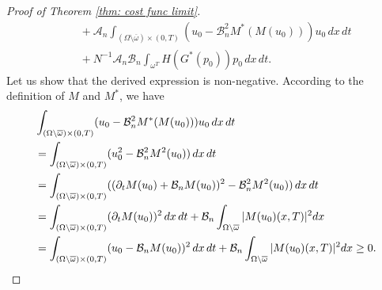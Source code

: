 \documentclass[reqno]{amsart}
\begin{document}
\begin{proof}[Proof of Theorem \ref{thm: cost func limit}]
\begin{align*}
&\quad +\mathcal{A}_n\int _{(\Omega \setminus \overline{\omega })\times
(0,T)}(u_0-\mathcal{B}_n^2M^{\ast }(M(u_0)))u_0\,dx\,dt \\
&\quad +N^{-1}\mathcal{A}_n\mathcal{B}_n\int _{\omega ^{T}}H(G^{\ast
}(p_0))p_0\,dx\,dt.
\end{align*}
Let us show that the derived expression is non-negative. According to the
definition of $M$ and $M^{\ast }$, we have
\begin{align*}
&\int _{(\Omega \setminus \overline{\omega })\times (0,T)}(u_0-
\mathcal{B}_n^2M^{\ast }(M(u_0)))u_0\,dx\,dt \\
&=\int _{(\Omega \setminus \overline{\omega })\times (0,T)}(u_0^2-\mathcal{B}%
_n^2M^2(u_0))\,dx\,dt \\
&=\int _{(\Omega \setminus \overline{\omega })\times (0,T)}((\partial
_{t}M(u_0)+\mathcal{B}_nM(u_0))^2-\mathcal{B}_n^2M^2(u_0)){%
\,dx\,dt} \\
&=\int _{(\Omega \setminus \overline{\omega })\times (0,T)}(\partial
_{t}M(u_0))^2\,dx\,dt+\mathcal{B}_n\int _{\Omega \setminus
\overline{\omega }}|M(u_0)(x,T)|^2{dx} \\
&=\int _{(\Omega \setminus \overline{\omega })\times (0,T)}(u_0-%
\mathcal{B}_nM(u_0))^2\,dx\,dt+\mathcal{B}_n\int _{\Omega
\setminus \overline{\omega }}|M(u_0)(x,T)|^2{dx} \ge 0.
\end{align*}


\end{proof}
\end{document}
